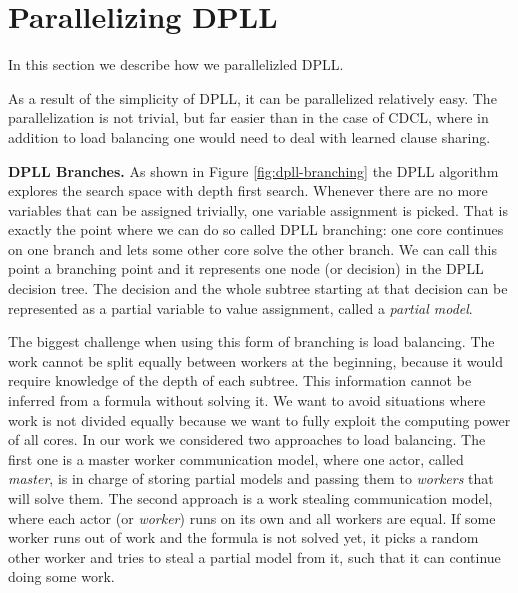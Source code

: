 \documentclass[letterpaper]{article}
\newcommand{\mypar}[1]{{\bf #1.}}
\begin{document}
\section{Parallelizing DPLL}\label{sec:parallel_dpll}
In this section we describe how we parallelizled DPLL.

As a result of the simplicity of DPLL, it can be parallelized relatively easy.
The parallelization is not trivial, but far easier than in the case of CDCL, where in addition to load balancing one would need to deal with learned clause sharing.

\mypar{DPLL Branches}
As shown in Figure \ref{fig:dpll-branching} the DPLL algorithm explores the search space with depth first search.
Whenever there are no more variables that can be assigned trivially, one variable assignment is picked.
That is exactly the point where we can do so called DPLL branching: one core continues on one branch and lets some other core solve the other branch.
We can call this point a branching point and it represents one node (or decision) in the DPLL decision tree.
The decision and the whole subtree starting at that decision can be represented as a partial variable to value assignment, called a \textit{partial model}.

The biggest challenge when using this form of branching is load balancing.
The work cannot be split equally between workers at the beginning, because it would require knowledge of the depth of each subtree.
This information cannot be inferred from a formula without solving it.
We want to avoid situations where work is not divided equally because we want to fully exploit the computing power of all cores.
In our work we considered two approaches to load balancing.
The first one is a master worker communication model, where one actor, called \textit{master}, is in charge of storing partial models and passing them to \textit{workers} that will solve them.
The second approach is a work stealing communication model, where each actor (or \textit{worker}) runs on its own and all workers are equal.
If some worker runs out of work and the formula is not solved yet, it picks a random other worker and tries to steal a partial model from it, such that it can continue doing some work.
\end{document}
